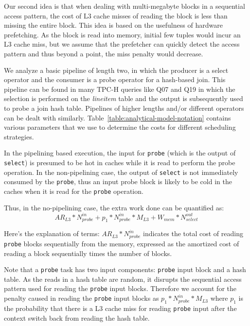 Our second idea is that when dealing with multi-megabyte blocks in a sequential access pattern, the cost of L3 cache misses of reading the block is less than missing the entire block.
This idea is based on the usefulness of hardware prefetching. 
As the block is read into memory, initial few tuples would incur an L3 cache miss, but we assume that the prefetcher can quickly detect the access pattern and thus beyond a point, the miss penalty would decrease. 

We analyze a basic pipeline of length two, in which the producer is a select operator and the consumer is a probe operator for a hash-based join. 
This pipeline can be found in many TPC-H queries like Q07 and Q19 in which the selection is performed on the \textit{lineitem} table and the output is subsequently used to probe a join hash table.
Pipelines of higher lengths and/or different operators can be dealt with similarly.
Table~\ref{table:analytical-model-notation} contains various parameters that we use to determine the costs for different scheduling strategies.

In the pipelining based execution, the input for \texttt{probe} (which is the output of \texttt{select}) is presumed to be hot in caches while it is read to perform the probe operation. 
In the non-pipelining case, the output of \texttt{select} is not immediately consumed by the \texttt{probe}, thus an input probe block is likely to be cold in the caches when it is read for the \texttt{probe} operation.

Thus, in the no-pipelining case, the extra work done can be quantified as:
\begin{equation*}
AR_{L3} * N^{in}_{probe} + p_1 * N^{in}_{probe} *  M_{L3} + W_{mem} * N^{out}_{select}
\end{equation*} 

Here's the explanation of terms: $AR_{L3} * N^{in}_{probe}$ indicates the total cost of reading \texttt{probe} blocks sequentially from the memory, expressed as the amortized cost of reading a block sequentially times the number of blocks. 

Note that a \texttt{probe} task has two input components: \texttt{probe} input block and a hash table.
As the reads in a hash table are random, it disrupts the sequential access pattern used for reading the \texttt{probe} input blocks.
Therefore we account for the penalty caused in reading the \texttt{probe} input blocks as $p_1 * N^{in}_{probe} *  M_{L3}$ where $p_1$ is the probability that there is a L3 cache miss for reading \texttt{probe} input after the context switch back from reading the hash table.

